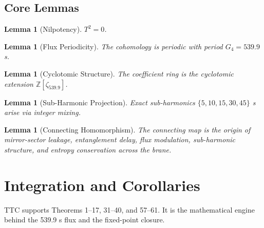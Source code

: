 \documentclass[11pt,a4paper]{book}
\newtheorem{lemma}[theorem]{Lemma}
\theoremstyle{remark}
\theoremstyle{definition}
\begin{document}
\subsection{Core Lemmas}

\begin{lemma}[Nilpotency]
\(T^2 = 0\).
\end{lemma}

\begin{lemma}[Flux Periodicity]
The cohomology is periodic with period \(G_4 = 539.9\) s.
\end{lemma}

\begin{lemma}[Cyclotomic Structure]
The coefficient ring is the cyclotomic extension \(\mathbb{Z}[\zeta_{539.9}]\).
\end{lemma}

\begin{lemma}[Sub-Harmonic Projection]
Exact sub-harmonics \(\{5,10,15,30,45\}\) s arise via integer mixing.
\end{lemma}

\begin{lemma}[Connecting Homomorphism]
The connecting map is the origin of mirror-sector leakage, entanglement delay, flux modulation, sub-harmonic structure, and entropy conservation across the brane.
\end{lemma}

\section{Integration and Corollaries}

TTC supports Theorems 1–17, 31–40, and 57–61. It is the mathematical engine behind the 539.9 s flux and the fixed-point closure.












\end{document}
